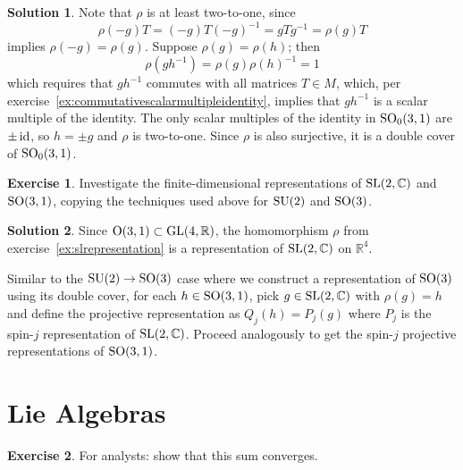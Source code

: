 \documentclass[11pt, a4paper]{report}
\theoremstyle{definition}
\newtheorem{exercise}{Exercise}[part]
\newtheorem{solution}{Solution}[part]
\newenvironment{ex}{\begin{exercise}}{\end{exercise}\pagebreak[1]}
\newenvironment{sol}{\begin{solution}}{\end{solution}\pagebreak[3]}
\newcommand*{\GL}{\ensuremath\text{GL}}
\newcommand*{\SL}{\ensuremath\text{SL}}
\renewcommand*{\O}{\ensuremath\text{O}}
\newcommand*{\SO}{\ensuremath\text{SO}}
\newcommand*{\SU}{\ensuremath\text{SU}}
\newcommand*{\id}{\ensuremath\mathop{}\mathopen{}\mathrm{id}}
\begin{document}
\begin{sol}

Note that $\rho$ is at least two-to-one, since
\[
    \rho(-g)T = (-g) T {(-g)}^{-1} = gTg^{-1} = \rho(g) T
\]
implies $\rho(-g) = \rho(g)$. Suppose $\rho(g) = \rho(h)$; then
\[
    \rho(gh^{-1}) = \rho(g) {\rho(h)}^{-1} = 1
\]
which requires that $gh^{-1}$ commutes with all matrices $T \in M$, which, per exercise~\ref{ex:commutativescalarmultipleidentity}, implies that $gh^{-1}$ is a scalar multiple of the identity.
The only scalar multiples of the identity in $\SO_0(3, 1)$ are $\pm \id$, so $h = \pm g$ and $\rho$ is two-to-one.
Since $\rho$ is also surjective, it is a double cover of $\SO_0(3, 1)$.

\end{sol}

\begin{ex}

Investigate the finite-dimensional representations of $\SL(2, \mathbb{C})$ and $\SO(3, 1)$, copying the techniques used above for $\SU(2)$ and $\SO(3)$.

\end{ex}

\begin{sol}

Since $\O(3, 1) \subset \GL(4, \mathbb{R})$, the homomorphism $\rho$ from exercise~\ref{ex:slrepresentation} is a representation of $\SL(2, \mathbb{C})$ on $\mathbb{R}^4$.

Similar to the $\SU(2) \to \SO(3)$ case where we construct a representation of $\SO(3)$ using its double cover, for each $h \in \SO(3, 1)$, pick $g \in \SL(2, \mathbb{C})$ with $\rho(g) = h$ and define the projective representation as $Q_j(h) = P_j(g)$ where $P_j$ is the spin-$j$ representation of $\SL(2, \mathbb{C})$.
Proceed analogously to get the spin-$j$ projective representations of $\SO(3, 1)$.

\end{sol}

\section{Lie Algebras}

\begin{ex}

For analysts: show that this sum converges.

\end{ex}
\end{document}
